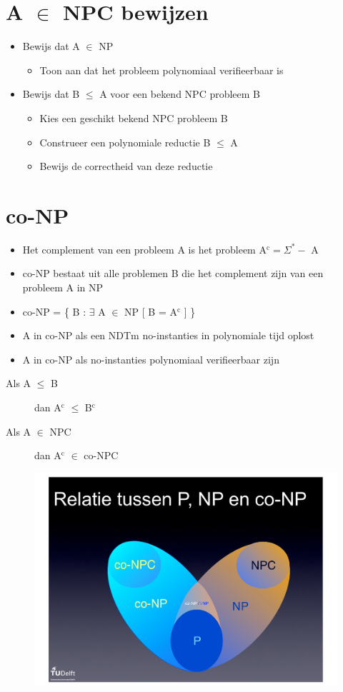\documentclass[]{article}
\begin{document}
\section*{A $\in$ NPC bewijzen}

\begin{itemize}
\item Bewijs dat A $\in$ NP
\begin{itemize}
\item Toon aan dat het probleem polynomiaal verifieerbaar is
\end{itemize}
\item Bewijs dat B $\leq$ A voor een bekend NPC probleem B
\begin{itemize}
\item Kies een geschikt bekend NPC probleem B
\item Construeer een polynomiale reductie B $\leq$ A
\item Bewijs de correctheid van deze reductie
\end{itemize}
\end{itemize}

\section*{co-NP}

\begin{itemize}
\item Het complement van een probleem A is het probleem A$^\text{c} = \Sigma^* - $ A
\item co-NP bestaat uit alle problemen B die het complement zijn van een probleem A in NP
\item co-NP = \{ B : $\exists$ A $\in$ NP [ B = A$^\text{c}$ ] \}
\item A in co-NP als een NDTm no-instanties in polynomiale tijd oplost
\item A in co-NP als no-instanties polynomiaal verifieerbaar zijn
\end{itemize}

\begin{description}
\item[Als A $\leq$ B] dan A$^\text{c}$ $\leq$ B$^\text{c}$
\item[Als A $\in$ NPC] dan A$^\text{c}$ $\in$ co-NPC
\end{description}

\begin{figure}[H]
\centering
\includegraphics[width=0.6\columnwidth]{slides/p-np-co-np}
\end{figure}
\end{document}
